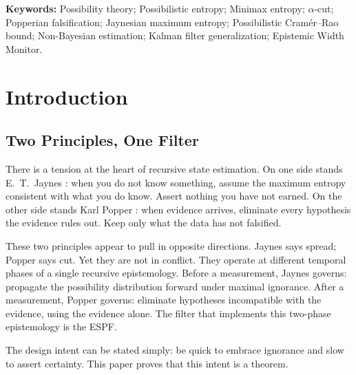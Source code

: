 \documentclass[12pt]{article}
\begin{document}
\begin{abstract}
The theorem rests on three lemmas. The Possibilistic Entropy Lemma decomposes $H_\pi$ into
a minimax term (minimized by Popperian survivor selection) and a gradient term (minimized
by compatibility-based possibility assignment). The Possibilistic Cram\'{e}r--Rao Bound
(PCRB) establishes the maximum rate at which any admissible filter may reduce $H_\pi$ per
measurement. The Evidence-Optimality Lemma proves that minimum-$q$ selection is the unique
minimizer of $H_\pi$ within the evidence-only class, and that any rule incorporating prior
possibility risks race-to-bottom bias and is strictly suboptimal.
\end{abstract}

\textbf{Keywords:} Possibility theory; Possibilistic entropy; Minimax entropy; $\alpha$-cut; Popperian falsification; Jaynesian maximum entropy; Possibilistic Cram\'{e}r--Rao bound; Non-Bayesian estimation; Kalman filter generalization; Epistemic Width Monitor.

\tableofcontents
\newpage

\section{Introduction}

\subsection{Two Principles, One Filter}

There is a tension at the heart of recursive state estimation. On one side stands E.\ T.\ Jaynes \cite{jaynes}:
when you do not know something, assume the maximum entropy consistent with what you do know.
Assert nothing you have not earned. On the other side stands Karl Popper \cite{popper}: when evidence
arrives, eliminate every hypothesis the evidence rules out. Keep only what the data has not falsified.

These two principles appear to pull in opposite directions. Jaynes says spread; Popper says cut. Yet
they are not in conflict. They operate at different temporal phases of a single recursive epistemology.
Before a measurement, Jaynes governs: propagate the possibility distribution forward under maximal
ignorance. After a measurement, Popper governs: eliminate hypotheses incompatible with the
evidence, using the evidence alone. The filter that implements this two-phase epistemology is the
ESPF.

The design intent can be stated simply: be quick to embrace ignorance and slow to assert certainty.
This paper proves that this intent is a theorem.
\end{document}
